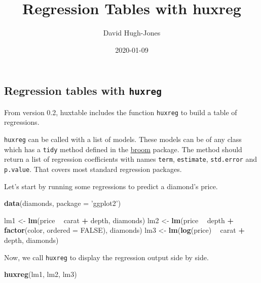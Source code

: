 \documentclass[]{article}
\title{Regression Tables with huxreg}
\author{David Hugh-Jones}
\date{2020-01-09}
\newenvironment{Shaded}{\begin{snugshade}}{\end{snugshade}}
\newcommand{\DataTypeTok}[1]{\textcolor[rgb]{0.13,0.29,0.53}{#1}}
\newcommand{\KeywordTok}[1]{\textcolor[rgb]{0.13,0.29,0.53}{\textbf{#1}}}
\newcommand{\NormalTok}[1]{#1}
\newcommand{\OperatorTok}[1]{\textcolor[rgb]{0.81,0.36,0.00}{\textbf{#1}}}
\newcommand{\OtherTok}[1]{\textcolor[rgb]{0.56,0.35,0.01}{#1}}
\newcommand{\StringTok}[1]{\textcolor[rgb]{0.31,0.60,0.02}{#1}}
\begin{document}
\maketitle

\hypertarget{regression-tables-with-huxreg}{%
\subsection{\texorpdfstring{Regression tables with
\texttt{huxreg}}{Regression tables with huxreg}}\label{regression-tables-with-huxreg}}

From version 0.2, huxtable includes the function \texttt{huxreg} to
build a table of regressions.

\texttt{huxreg} can be called with a list of models. These models can be
of any class which has a \texttt{tidy} method defined in the
\href{https://cran.r-project.org/?package=broom}{broom} package. The
method should return a list of regression coefficients with names
\texttt{term}, \texttt{estimate}, \texttt{std.error} and
\texttt{p.value}. That covers most standard regression packages.

Let's start by running some regressions to predict a diamond's price.

\begin{Shaded}
\begin{Highlighting}[]
\KeywordTok{data}\NormalTok{(diamonds, }\DataTypeTok{package =} \StringTok{'ggplot2'}\NormalTok{)}

\NormalTok{lm1 <-}\StringTok{ }\KeywordTok{lm}\NormalTok{(price }\OperatorTok{~}\StringTok{ }\NormalTok{carat }\OperatorTok{+}\StringTok{ }\NormalTok{depth, diamonds)}
\NormalTok{lm2 <-}\StringTok{ }\KeywordTok{lm}\NormalTok{(price }\OperatorTok{~}\StringTok{ }\NormalTok{depth }\OperatorTok{+}\StringTok{ }\KeywordTok{factor}\NormalTok{(color, }\DataTypeTok{ordered =} \OtherTok{FALSE}\NormalTok{), diamonds)}
\NormalTok{lm3 <-}\StringTok{ }\KeywordTok{lm}\NormalTok{(}\KeywordTok{log}\NormalTok{(price) }\OperatorTok{~}\StringTok{ }\NormalTok{carat }\OperatorTok{+}\StringTok{ }\NormalTok{depth, diamonds)}
\end{Highlighting}
\end{Shaded}

\FloatBarrier

Now, we call \texttt{huxreg} to display the regression output side by
side.

\begin{Shaded}
\begin{Highlighting}[]
\KeywordTok{huxreg}\NormalTok{(lm1, lm2, lm3)}
\end{Highlighting}
\end{Shaded}
\end{document}
